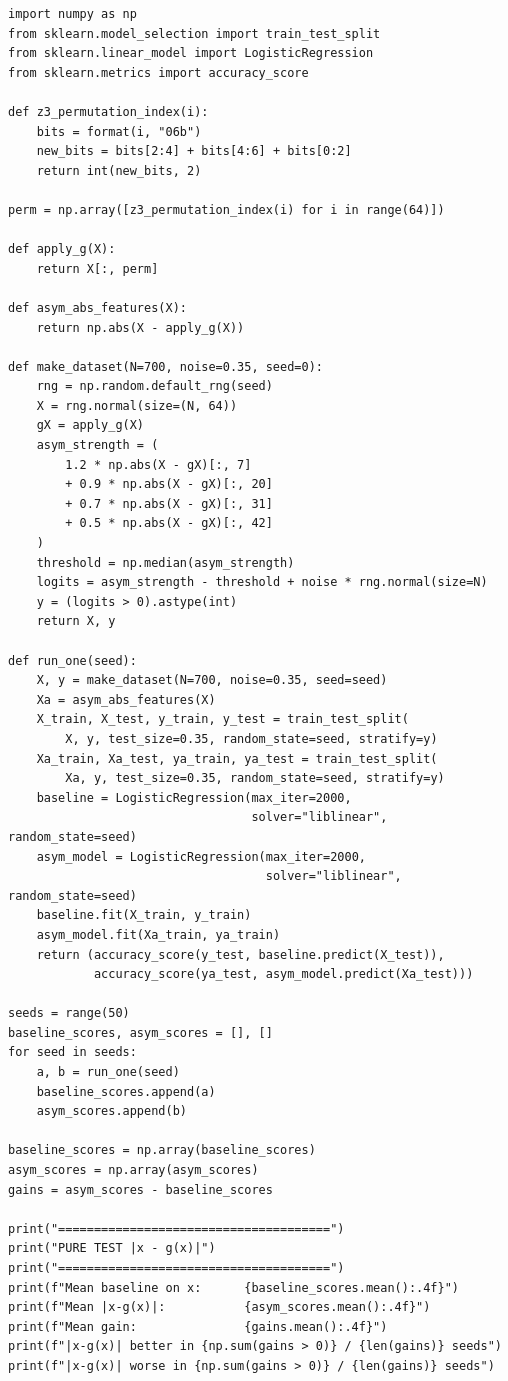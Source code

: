 \documentclass[11pt,a4paper]{report}
\begin{document}
\label{app:ch3-lst7}
\begin{lstlisting}[caption=SBOHN Experiment 4: pure $|x-g(x)|$ test]
import numpy as np
from sklearn.model_selection import train_test_split
from sklearn.linear_model import LogisticRegression
from sklearn.metrics import accuracy_score

def z3_permutation_index(i):
    bits = format(i, "06b")
    new_bits = bits[2:4] + bits[4:6] + bits[0:2]
    return int(new_bits, 2)

perm = np.array([z3_permutation_index(i) for i in range(64)])

def apply_g(X):
    return X[:, perm]

def asym_abs_features(X):
    return np.abs(X - apply_g(X))

def make_dataset(N=700, noise=0.35, seed=0):
    rng = np.random.default_rng(seed)
    X = rng.normal(size=(N, 64))
    gX = apply_g(X)
    asym_strength = (
        1.2 * np.abs(X - gX)[:, 7]
        + 0.9 * np.abs(X - gX)[:, 20]
        + 0.7 * np.abs(X - gX)[:, 31]
        + 0.5 * np.abs(X - gX)[:, 42]
    )
    threshold = np.median(asym_strength)
    logits = asym_strength - threshold + noise * rng.normal(size=N)
    y = (logits > 0).astype(int)
    return X, y

def run_one(seed):
    X, y = make_dataset(N=700, noise=0.35, seed=seed)
    Xa = asym_abs_features(X)
    X_train, X_test, y_train, y_test = train_test_split(
        X, y, test_size=0.35, random_state=seed, stratify=y)
    Xa_train, Xa_test, ya_train, ya_test = train_test_split(
        Xa, y, test_size=0.35, random_state=seed, stratify=y)
    baseline = LogisticRegression(max_iter=2000,
                                  solver="liblinear", random_state=seed)
    asym_model = LogisticRegression(max_iter=2000,
                                    solver="liblinear", random_state=seed)
    baseline.fit(X_train, y_train)
    asym_model.fit(Xa_train, ya_train)
    return (accuracy_score(y_test, baseline.predict(X_test)),
            accuracy_score(ya_test, asym_model.predict(Xa_test)))

seeds = range(50)
baseline_scores, asym_scores = [], []
for seed in seeds:
    a, b = run_one(seed)
    baseline_scores.append(a)
    asym_scores.append(b)

baseline_scores = np.array(baseline_scores)
asym_scores = np.array(asym_scores)
gains = asym_scores - baseline_scores

print("======================================")
print("PURE TEST |x - g(x)|")
print("======================================")
print(f"Mean baseline on x:      {baseline_scores.mean():.4f}")
print(f"Mean |x-g(x)|:           {asym_scores.mean():.4f}")
print(f"Mean gain:               {gains.mean():.4f}")
print(f"|x-g(x)| better in {np.sum(gains > 0)} / {len(gains)} seeds")
print(f"|x-g(x)| worse in {np.sum(gains > 0)} / {len(gains)} seeds")
\end{lstlisting}
\end{document}
